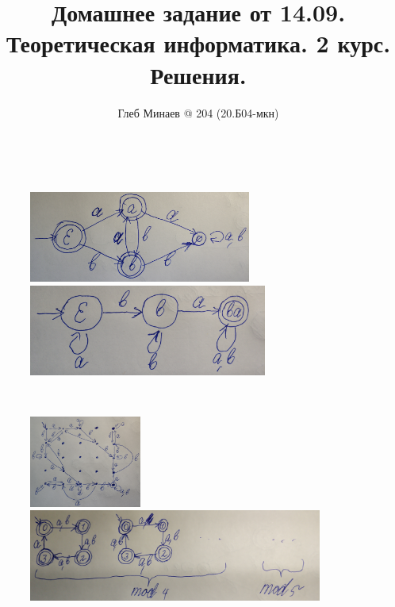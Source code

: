 \documentclass[12pt,a4paper]{article}
\title{Домашнее задание от 14.09.\\Теоретическая информатика. 2 курс.\\Решения.}
\author{Глеб Минаев @ 204 (20.Б04-мкн)}
\begin{document}
    \maketitle

    \begin{multicols}{2}
        \tableofcontents
    \end{multicols}

    \begin{problem}{1}\ 
        \begin{figure}[H]
            \centering
            \includegraphics[height=3cm]{TI-HW-002-1.jpg}
            \includegraphics[height=3cm]{TI-HW-002-2.jpg}
        \end{figure}
    \end{problem}

    \begin{problem}{2}\ 
        \begin{figure}[H]
            \centering
            \includegraphics[height=3cm]{TI-HW-002-3.jpg}
            \includegraphics[height=3cm]{TI-HW-002-4.jpg}
        \end{figure}
    \end{problem}
\end{document}
